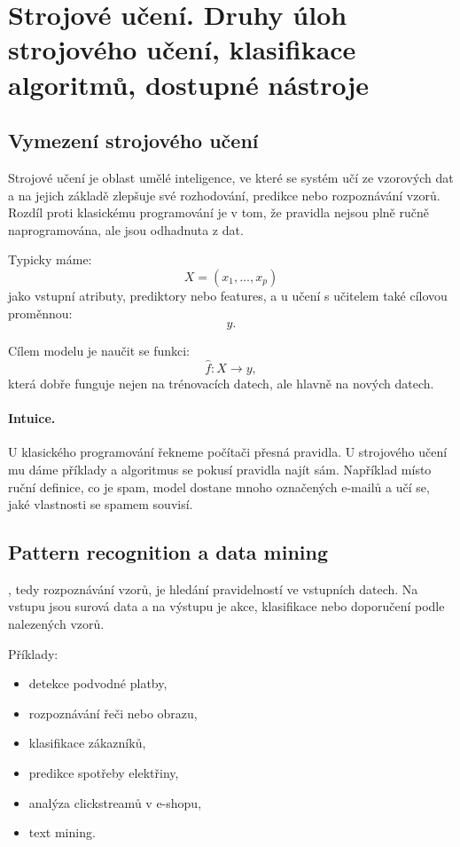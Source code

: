 \section{Strojové učení. Druhy úloh strojového učení, klasifikace algoritmů, dostupné nástroje}


\subsection{Vymezení strojového učení}

Strojové učení je oblast umělé inteligence, ve které se systém učí ze vzorových dat a na jejich základě
zlepšuje své rozhodování, predikce nebo rozpoznávání vzorů. Rozdíl proti klasickému programování je v tom,
že pravidla nejsou plně ručně naprogramována, ale jsou odhadnuta z dat.

Typicky máme:
\[
X = (x_1,\ldots,x_p)
\]
jako vstupní atributy, prediktory nebo features, a u učení s učitelem také cílovou proměnnou:
\[
y.
\]

Cílem modelu je naučit se funkci:
\[
\hat{f}: X \rightarrow y,
\]
která dobře funguje nejen na trénovacích datech, ale hlavně na nových datech.

\paragraph{Intuice.}
U klasického programování řekneme počítači přesná pravidla. U strojového učení mu dáme příklady a algoritmus
se pokusí pravidla najít sám. Například místo ruční definice, co je spam, model dostane mnoho označených
e-mailů a učí se, jaké vlastnosti se spamem souvisí.

\subsection{Pattern recognition a data mining}

, tedy rozpoznávání vzorů, je hledání pravidelností ve vstupních datech.
Na vstupu jsou surová data a na výstupu je akce, klasifikace nebo doporučení podle nalezených vzorů.

Příklady:
\begin{itemize}
    \item detekce podvodné platby,
    \item rozpoznávání řeči nebo obrazu,
    \item klasifikace zákazníků,
    \item predikce spotřeby elektřiny,
    \item analýza clickstreamů v e-shopu,
    \item text mining.
\end{itemize}

